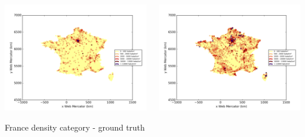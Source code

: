 \documentclass[c]{beamer}
\begin{document}
\begin{frame}
\begin{columns}
 \begin{column}{0.5\textwidth}
  \begin{overlayarea}{\linewidth}{4cm}
    \centering\vfill
    \includegraphics[scale=0.25]{../../data/France/test/Neural_Network_Classification-oversampling/Neural_Network_Classification-oversampling/density_ground_truth.png}
  \end{overlayarea}
  \begin{overlayarea}{\linewidth}{0.5cm}
    \centering
    \tiny France density category - ground truth\par
  \end{overlayarea}
 \end{column}
 \begin{column}{0.5\textwidth}
  \begin{overlayarea}{\linewidth}{4cm}
    \centering\vfill
    \includegraphics[scale=0.25]{../../data/France/test/Neural_Network_Classification-oversampling/Neural_Network_Classification-oversampling/density_classification.png}

\end{overlayarea}
\end{column}
\end{columns}
\end{frame}
\end{document}
